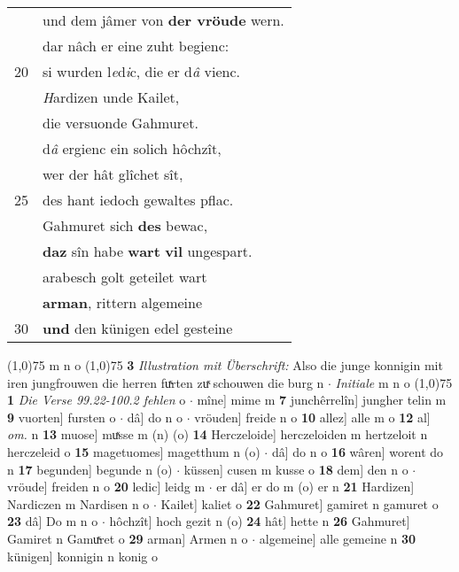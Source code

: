 \documentclass[8pt,a4paper,notitlepage]{article}
\begin{document}
\begin{table}[ht]
\begin{minipage}[t]{0.5\linewidth}
\begin{tabular}{rl}
 & und dem jâmer von \textbf{der vröude} wern.\\ 
 & dar nâch er eine zuht begienc:\\ 
20 & si wurden l\textit{e}d\textit{i}c, die er d\textit{â} vienc.\\ 
 & \textit{H}ardizen unde Kailet,\\ 
 & die versuonde Gahmuret.\\ 
 & d\textit{â} ergienc ein solich hôchzît,\\ 
 & wer der hât glîchet sît,\\ 
25 & des hant iedoch gewaltes pflac.\\ 
 & Gahmuret sich \textbf{des} bewac,\\ 
 & \textbf{daz} sîn habe \textbf{wart} \textbf{vil} ungespart.\\ 
 & arabesch golt geteilet wart\\ 
 & \textbf{arman}, rittern algemeine\\ 
30 & \textbf{und} den künigen edel gesteine\\ 
\end{tabular}
\scriptsize
\line(1,0){75} \newline
m n o \newline
\line(1,0){75} \newline
\textbf{3} \textit{Illustration mit Überschrift:} Also die junge konnigin mit iren jungfrouwen die herren fuͯrten zuͯ schouwen die burg n   $\cdot$ \textit{Initiale} m n o  \newline
\line(1,0){75} \newline
\textbf{1} \textit{Die Verse 99.22-100.2 fehlen} o   $\cdot$ mîne] mime m \textbf{7} junchêrrelîn] jungher telin m \textbf{9} vuorten] fursten o  $\cdot$ dâ] do n o  $\cdot$ vröuden] freide n o \textbf{10} allez] alle m o \textbf{12} al] \textit{om.} n \textbf{13} muose] muͯsse m (n) (o) \textbf{14} Herczeloide] herczeloiden m hertzeloit n herczeleid o \textbf{15} magetuomes] magetthum n (o)  $\cdot$ dâ] do n o \textbf{16} wâren] worent do n \textbf{17} begunden] begunde n (o)  $\cdot$ küssen] cusen m kusse o \textbf{18} dem] den n o  $\cdot$ vröude] freiden n o \textbf{20} ledic] leidg m  $\cdot$ er dâ] er do m (o) er n \textbf{21} Hardizen] Nardiczen m Nardisen n o  $\cdot$ Kailet] kaliet o \textbf{22} Gahmuret] gamiret n gamuret o \textbf{23} dâ] Do m n o  $\cdot$ hôchzît] hoch gezit n (o) \textbf{24} hât] hette n \textbf{26} Gahmuret] Gamiret n Gamuͯret o \textbf{29} arman] Armen n o  $\cdot$ algemeine] alle gemeine n \textbf{30} künigen] konnigin n konig o \newline
\end{minipage}
\end{table}
\end{document}
